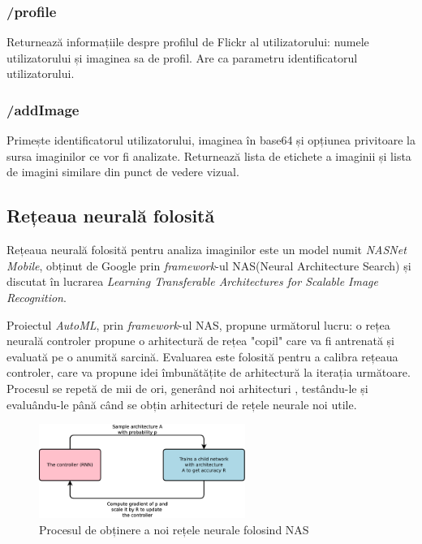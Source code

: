 \subsubsection{/profile}
Returnează informațiile despre profilul de Flickr al utilizatorului: numele utilizatorului și imaginea sa de profil. Are ca parametru identificatorul utilizatorului.

\subsubsection{/addImage}
Primește identificatorul utilizatorului, imaginea în base64 și opțiunea privitoare la sursa imaginilor ce vor fi analizate. Returnează lista de etichete a imaginii și lista de imagini similare din punct de vedere vizual.

\subsection{Rețeaua neurală folosită}
Rețeaua neurală folosită pentru analiza imaginilor este un model numit \textit{NASNet Mobile}, obținut de Google prin \textit{framework}-ul NAS(Neural Architecture Search) și discutat în lucrarea \textit{Learning Transferable Architectures for Scalable Image Recognition}. \cite{DBLP:journals/corr/ZophVSL17}

Proiectul \textit{AutoML}, prin \textit{framework}-ul NAS, propune următorul lucru: o rețea neurală controler propune o arhitectură de rețea "copil" care va fi antrenată și evaluată pe o anumită sarcină. Evaluarea este folosită pentru a calibra rețeaua controler, care va propune idei îmbunătățite de arhitectură la iterația următoare. Procesul se repetă de mii de ori, generând noi arhitecturi , testându-le și evaluându-le până când se obțin arhitecturi de rețele neurale noi utile.\cite{2016arXiv161101578Z}

\begin{figure}[!htbp]
    \begin{center}
        \includegraphics[width=0.6\textwidth]{images/nas.png}
        \caption{Procesul de obținere a noi rețele neurale folosind NAS \cite{2016arXiv161101578Z}}
    \end{center}
\end{figure}


